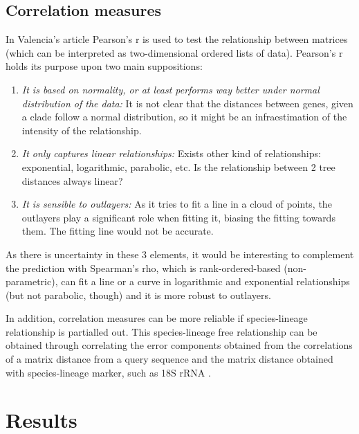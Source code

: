 \documentclass[11pt]{article}
\begin{document}
\subsection{Correlation measures}
In Valencia's article\cite{Pazos2001} Pearson's r is used to test the relationship between matrices (which can be interpreted as two-dimensional ordered lists of data). Pearson's r holds its purpose upon two main suppositions:
\begin{enumerate}
\setlength{\itemsep}{1pt}
	\item \textit{It is based on normality, or at least performs way better under normal distribution of the data:} It is not clear that the distances between genes, given a clade follow a normal distribution, so it might be an infraestimation of the intensity of the relationship.
	\item \textit{It only captures linear relationships:} Exists other kind of relationships: exponential, logarithmic, parabolic, etc. Is the relationship between 2 tree distances always linear?
	\item \textit{It is sensible to outlayers:} As it tries to fit a line in a cloud of points, the outlayers play a significant role when fitting it, biasing the fitting towards them. The fitting line would not be accurate.
\end{enumerate}
As there is uncertainty in these 3 elements, it would be interesting to complement the prediction with Spearman's rho, which is rank-ordered-based (non-parametric), can fit a line or a curve in logarithmic and exponential relationships (but not parabolic, though) and it is more robust to outlayers.

In addition, correlation measures can be more reliable if species-lineage relationship is partialled out\cite{Sato2005}. This species-lineage free relationship can be obtained through correlating the error components obtained from the correlations of a matrix distance from a query sequence and the matrix distance obtained with species-lineage marker, such as 18S rRNA \cite{Sato2005}.

\section{Results}


	
\end{document}
